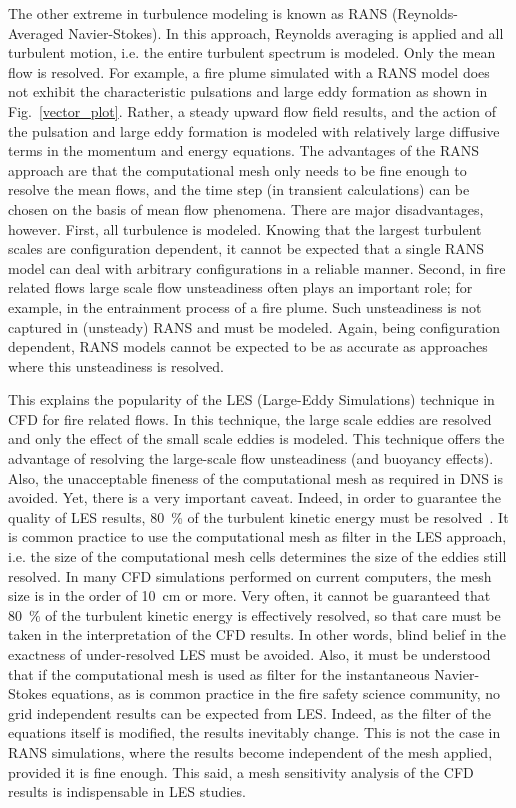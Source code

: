 \documentclass[graybox]{svmult}
\begin{document}
The other extreme in turbulence modeling is known as RANS (Reynolds-Averaged Navier-Stokes). In this approach, Reynolds averaging is applied and all turbulent motion, i.e. the entire turbulent spectrum is modeled. Only the mean flow is resolved. For example, a fire plume simulated with a RANS model does not exhibit the characteristic pulsations and large eddy formation as shown in Fig.~\ref{vector_plot}. Rather, a steady upward flow field results, and the action of the pulsation and large eddy formation is modeled with relatively large diffusive terms in the momentum and energy equations. The advantages of the RANS approach are that the computational mesh only needs to be fine enough to resolve the mean flows, and the time step (in transient calculations) can be chosen on the basis of mean flow phenomena. There are major disadvantages, however. First, all turbulence is modeled. Knowing that the largest turbulent scales are configuration dependent, it cannot be expected that a single RANS model can deal with arbitrary configurations in a reliable manner. Second, in fire related flows large scale flow unsteadiness often plays an important role; for example, in the entrainment process of a fire plume. Such unsteadiness is not captured in (unsteady) RANS and must be modeled. Again, being configuration dependent, RANS models cannot be expected to be as accurate as approaches where this unsteadiness is resolved.

This explains the popularity of the LES (Large-Eddy Simulations) technique in CFD for fire related flows. In this technique, the large scale eddies are resolved and only the effect of the small scale eddies is modeled. This technique offers the advantage of resolving the large-scale flow unsteadiness (and buoyancy effects). Also, the unacceptable fineness of the computational mesh as required in DNS is avoided. Yet, there is a very important caveat. Indeed, in order to guarantee the quality of LES results, 80~\% of the turbulent kinetic energy must be resolved~\cite{Pope:2000}. It is common practice to use the computational mesh as filter in the LES approach, i.e. the size of the computational mesh cells determines the size of the eddies still resolved. In many CFD simulations performed on current computers, the mesh size is in the order of 10~cm or more. Very often, it cannot be guaranteed that 80~\% of the turbulent kinetic energy is effectively resolved, so that care must be taken in the interpretation of the CFD results. In other words, blind belief in the exactness of under-resolved LES must be avoided. Also, it must be understood that if the computational mesh is used as filter for the instantaneous Navier-Stokes equations, as is common practice in the fire safety science community, no grid independent results can be expected from LES. Indeed, as the filter of the equations itself is modified, the results inevitably change. This is not the case in RANS simulations, where the results become independent of the mesh applied, provided it is fine enough. This said, a mesh sensitivity analysis of the CFD results is indispensable in LES studies. 
\end{document}
